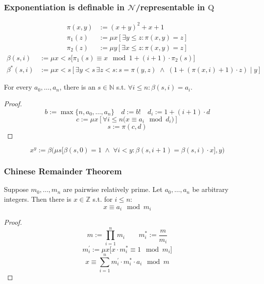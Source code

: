\documentclass[UTF8,aspectratio=43,11pt,colorlinks,compress,openany]{beamer}%
\begin{document}
\begin{frame}\frametitle{Exponentiation is definable in $\mathcal{N}$/representable in $\mathrm{Q}$}\vspace{-2ex}
\setlength\abovedisplayskip{0pt}
\setlength\belowdisplayskip{0pt}
	\begin{align*}
	\pi(x,y)&:=(x+y)^2+x+1\\
	\pi_1(z)&:=\mu x[\exists y\leq z:\pi(x,y)=z]\\
	\pi_2(z)&:=\mu y[\exists x\leq z:\pi(x,y)=z]
	\end{align*}
	\begin{align*}
	\beta(s,i)&:=\mu x<s\big[\pi_1(s)\equiv x\mod 1+(i+1)\cdot \pi_2(s)\big]\\
	\beta^*(s,i)&:=\mu x<s\left[\exists y<s\,\exists z<s: s=\pi(y,z)\;\wedge\;(1+(\pi(x,i)+1)\cdot z)\mid y\right]
	\end{align*}
	\begin{lemma}
		For every $a_0,\dots,a_n$, there is an $s\in\mathbb{N}$ s.t. $\forall i\leq n:\beta(s,i)=a_i$.
	\end{lemma}
	\begin{proof}\vspace{-1ex}
		\[b:=\max\{n,a_0,\dots,a_n\}\quad d:=b!\quad d_i:=1+(i+1)\cdot d\]
		\[c:=\mu x\left[\forall i\leq n\big(x\equiv a_i\mod d_i\big)\right]\]
		\[s:=\pi(c,d)\]\vspace{-3ex}
	\end{proof}\vspace{-2ex}
	\[x^y:=\beta\Big(\mu s\big[\beta(s,0)=1\;\wedge\;\forall i<y:\beta(s,i+1)=\beta(s,i)\cdot x\big],y\Big)\]
\end{frame}

\begin{frame}\frametitle{Chinese Remainder Theorem}
	\begin{theorem}
		Suppose $m_0,\dots,m_n$ are pairwise relatively prime. Let
		$a_0,\dots,a_n$ be arbitrary integers. Then there is $x\in\mathbb{Z}$ s.t. for $i\leq n:$
		\[x\equiv a_i\mod m_i\]
	\end{theorem}
	\begin{proof}
		\[m:=\prod\limits_{i=1}^n m_i\qquad m_i^*:=\frac{m}{m_i}\]
		\[m_i^\prime:=\mu x\big[x\cdot m_i^*\equiv 1\mod m_i\big]\]
		\[x\equiv\sum\limits_{i=1}^n m_i^\prime\cdot m_i^*\cdot a_i\mod m\]\vspace{-1ex}
	\end{proof}
\end{frame}
\end{document}
